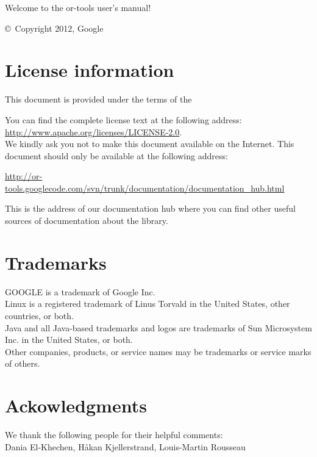 \begin{titlepage}
{\Large Welcome to the or-tools user's manual!}\\


\copyright\ Copyright 2012, Google\\



\section*{License information}

\fancyfoot{}
\fancyhead[LE,RO]{\textsc{\thepage}}

This document is provided under the terms of the 
\begin{center}
  \begin{large}\end{large}
\end{center}
You can find the complete license text at the following address: \url{http://www.apache.org/licenses/LICENSE-2.0}.\\

We kindly ask you not to make this document available on the Internet. This document should only be available at the following address:
\begin{center}
  \url{http://or-tools.googlecode.com/svn/trunk/documentation/documentation_hub.html}
\end{center}
This is the address of our documentation hub where you can find other useful sources of documentation about the  library.

\section*{Trademarks}
GOOGLE is a trademark of Google Inc.\\
Linux is a registered trademark of Linus Torvald in the United States, other countries, or both.\\
Java and all Java-based trademarks and logos are trademarks of Sun Microsystem Inc. in the United States, or both.\\
Other companies, products, or service names may be trademarks or service marks of others.

\section*{Ackowledgments}
We thank the following people for their helpful comments:\\
Dania El-Khechen, H\r{a}kan Kjellerstrand, Louis-Martin Rousseau
\end{titlepage}

